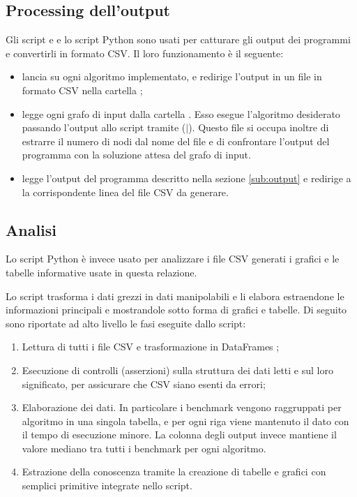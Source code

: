 \subsection{Processing dell'output}

Gli script  e  e lo script Python  sono usati per catturare gli output dei programmi e convertirli in formato CSV. Il loro funzionamento è il seguente:

\begin{itemize}
    \item {} lancia  su ogni algoritmo implementato, e redirige l'output in un file in formato CSV nella cartella ;
    \item {} legge ogni grafo di input dalla cartella . Esso esegue l'algoritmo desiderato passando l'output allo script  tramite  ($\vert$). Questo file si occupa inoltre di estrarre il numero di nodi dal nome del file e di confrontare l'output del programma con la soluzione attesa del grafo di input.
    \item {} legge l'output del programma descritto nella sezione \ref{sub:output} e redirige a  la corrispondente linea del file CSV da generare.
\end{itemize}

\subsection{Analisi}

\noindent Lo script Python  è invece usato per analizzare i file CSV generati i grafici e le tabelle informative usate in questa relazione.

\noindent Lo script trasforma i dati grezzi in dati manipolabili e li
elabora estraendone le informazioni principali e mostrandole sotto
forma di grafici e tabelle. Di seguito sono riportate ad alto
livello le fasi eseguite dallo script:

\begin{enumerate}
    \item Lettura di tutti i file CSV e trasformazione in DataFrames ;
    \item Esecuzione di controlli (asserzioni) sulla struttura dei dati
      letti e sul loro significato, per assicurare che CSV siano esenti da errori;
    \item Elaborazione dei dati. In particolare i benchmark vengono raggruppati
      per algoritmo in una singola tabella, e per ogni riga
      viene mantenuto il dato con il tempo di esecuzione minore. La
      colonna degli output invece mantiene il valore mediano tra tutti
      i benchmark per ogni algoritmo.
    \item Estrazione della conoscenza tramite la creazione di tabelle
      e grafici con semplici primitive integrate nello script.
    \label{script-phase-analysis}
\end{enumerate}

